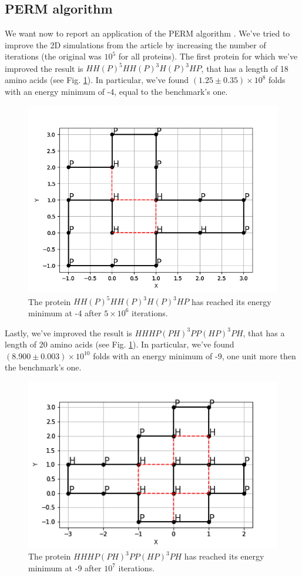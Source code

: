 
\subsection{PERM algorithm}
We want now to report an application of the PERM algorithm \cite{PERM}.
We've tried to improve the 2D simulations from the article by increasing the number of iterations (the original was $10^5$ for all proteins).
The first protein for which we've improved the result is $HH(P)^5HH(P)^3H(P)^3HP$, that has a length of 18 amino acids (see Fig. \ref{fig:18_1}).
In particular, we've found $(1.25 \pm 0.35) \times 10^8$ folds with an energy minimum of -4, equal to the benchmark's one.
\begin{figure}[H]
    \centering
    \includegraphics[width=.75\textwidth]{./img/18_1.png}
    \caption{The protein $HH(P)^5HH(P)^3H(P)^3HP$ has reached its energy minimum at -4 after $5 \times 10^6$ iterations.}
    \label{fig:18_1}
\end{figure}

Lastly, we've improved the result is $HHHP(PH)^3PP(HP)^3PH$, that has a length of 20 amino acids (see Fig. \ref{fig:18_1}).
In particular, we've found $(8.900 \pm 0.003) \times 10^10$ folds with an energy minimum of -9, one unit more then the benchmark's one.
\begin{figure}[H]
    \centering
    \includegraphics[width=.75\textwidth]{./img/20_2.png}
    \caption{The protein $HHHP(PH)^3PP(HP)^3PH$ has reached its energy minimum at -9 after $10^7$ iterations.}
    \label{fig:20_2}
\end{figure}
